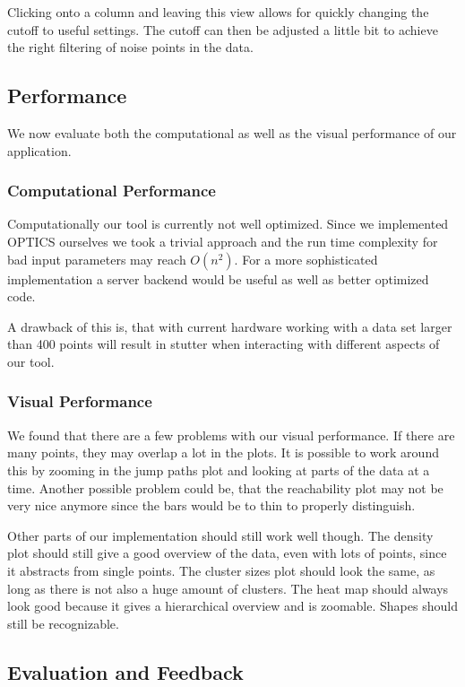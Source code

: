 \documentclass{vgtc} %
\begin{document}
Clicking onto a column and leaving this view allows for quickly changing the
cutoff to useful settings. The cutoff can then be adjusted a little bit to
achieve the right filtering of noise points in the data.

\subsection{Performance}

We now evaluate both the computational as well as the visual performance of our
application.

\subsubsection{Computational Performance}

Computationally our tool is currently not well optimized. Since we implemented
OPTICS ourselves we took a trivial approach and the run time complexity for bad
input parameters may reach $ O(n^{2}) $. For a more sophisticated
implementation a server backend would be useful as well as better optimized
code.

A drawback of this is, that with current hardware working with a data set larger
than 400 points will result in stutter when interacting with different aspects
of our tool.

\subsubsection{Visual Performance}

We found that there are a few problems with our visual performance. If there
are many points, they may overlap a lot in the plots. It is possible to work
around this by zooming in the jump paths plot and looking at parts of the data
at a time. Another possible problem could be, that the reachability plot may
not be very nice anymore since the bars would be to thin to properly
distinguish.

Other parts of our implementation should still work well though. The density
plot should still give a good overview of the data, even with lots of points,
since it abstracts from single points. The cluster sizes plot should look the
same, as long as there is not also a huge amount of clusters. The heat map
should always look good because it gives a hierarchical overview and is
zoomable. Shapes should still be recognizable.

\subsection{Evaluation and Feedback}
\end{document}
